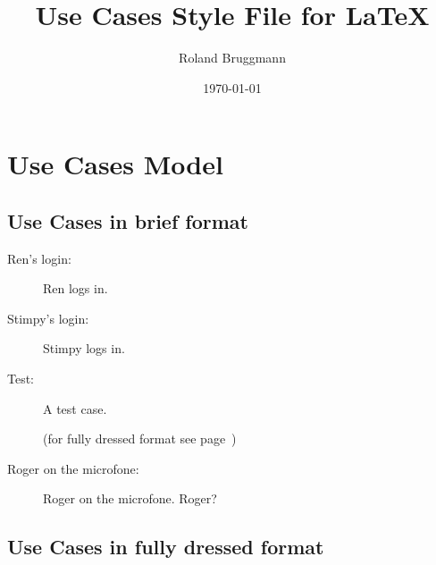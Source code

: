 \documentclass[a4paper, 10pt, oneside, draft]{article}
\title{Use Cases Style File for \LaTeX}
\date{\today}
\author{Roland Bruggmann}
\begin{document}
\maketitle
\tableofcontents
% 
\newpage
% 
\section{Use Cases Model}
\label{sec:use_cases_model}
% 
\subsection{Use Cases in brief format}
\label{subsec:uc_in_brief_format}
% 
\begin{description}
  \item[Ren's login:] Ren logs in.

  \item[Stimpy's login:] Stimpy logs in.

  \item[Test:] A test case.

  (for fully dressed format see page~\pageref{uc:Test})

  \item[Roger on the microfone:] Roger on the microfone. Roger?
\end{description}
% 
\newpage
% 
\subsection{Use Cases in fully dressed format}
\label{subsec:uc_in_fully_dressed_format}
\end{document}
